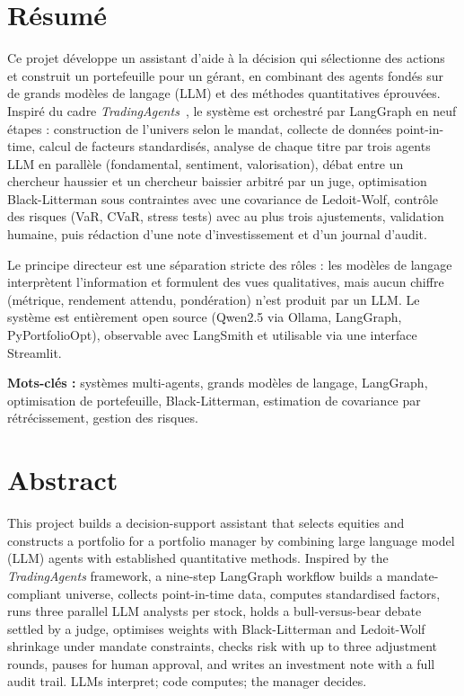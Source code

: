 \documentclass[11pt,a4paper]{report}
\begin{document}
\chapter*{Résumé}
Ce projet développe un assistant d'aide à la décision qui sélectionne des actions et construit un portefeuille
pour un gérant, en combinant des agents fondés sur de grands modèles de langage (LLM) et des méthodes
quantitatives éprouvées. Inspiré du cadre \emph{TradingAgents}~\cite{tradingagents}, le système est orchestré
par LangGraph en neuf étapes : construction de l'univers selon le mandat, collecte de données point-in-time,
calcul de facteurs standardisés, analyse de chaque titre par trois agents LLM en parallèle (fondamental,
sentiment, valorisation), débat entre un chercheur haussier et un chercheur baissier arbitré par un juge,
optimisation Black-Litterman sous contraintes avec une covariance de Ledoit-Wolf, contrôle des risques
(VaR, CVaR, stress tests) avec au plus trois ajustements, validation humaine, puis rédaction d'une note
d'investissement et d'un journal d'audit.

Le principe directeur est une séparation stricte des rôles : les modèles de langage interprètent
l'information et formulent des vues qualitatives, mais aucun chiffre (métrique, rendement attendu,
pondération) n'est produit par un LLM. Le système est entièrement open source (Qwen2.5 via Ollama,
LangGraph, PyPortfolioOpt), observable avec LangSmith et utilisable via une interface Streamlit.

\medskip\noindent\textbf{Mots-clés :} systèmes multi-agents, grands modèles de langage, LangGraph,
optimisation de portefeuille, Black-Litterman, estimation de covariance par rétrécissement, gestion des risques.

\chapter*{Abstract}
This project builds a decision-support assistant that selects equities and constructs a portfolio for a
portfolio manager by combining large language model (LLM) agents with established quantitative methods.
Inspired by the \emph{TradingAgents} framework, a nine-step LangGraph workflow builds a mandate-compliant
universe, collects point-in-time data, computes standardised factors, runs three parallel LLM analysts per stock,
holds a bull-versus-bear debate settled by a judge, optimises weights with Black-Litterman and Ledoit-Wolf
shrinkage under mandate constraints, checks risk with up to three adjustment rounds, pauses for human
approval, and writes an investment note with a full audit trail. LLMs interpret; code computes; the manager decides.
\end{document}
